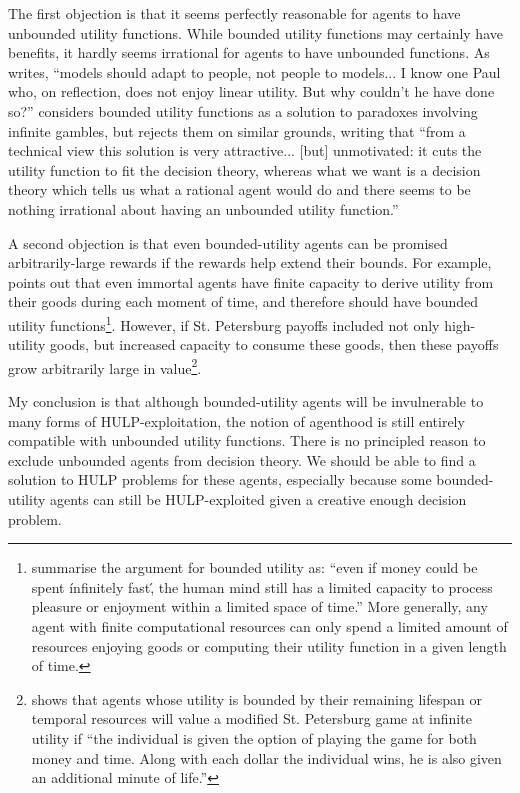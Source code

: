 \documentclass{article}
\begin{document}
The first objection is that it seems perfectly reasonable for agents to have unbounded utility functions. While bounded utility functions may certainly have benefits, it hardly seems irrational for agents to have unbounded functions. As \citep{samuelson1977st} writes, ``models should adapt to people, not people to models... I know one Paul who, on reflection, does not enjoy linear utility. But why couldn't he have done so?'' \citep{smith2014evaluative} considers bounded utility functions as a solution to paradoxes involving infinite gambles, but rejects them on similar grounds, writing that ``from a technical view this solution is very attractive... [but] unmotivated: it cuts the utility function to fit the decision theory, whereas what we want is a decision theory which tells us what a rational agent would do \textemdash{} and there seems to be nothing irrational about having an unbounded utility function.''

A second objection is that even bounded-utility agents can be promised arbitrarily-large rewards if the rewards help extend their bounds. For example, \citep{brito1975becker} points out that even immortal agents have finite capacity to derive utility from their goods during each moment of time, and therefore should have bounded utility functions\footnote{\citep{cowen1988time} summarise the argument for bounded utility as: ``even if money could be spent \'infinitely fast\', the human mind still has a limited capacity to process pleasure or enjoyment within a limited space of time.'' More generally, any agent with finite computational resources can only spend a limited amount of resources enjoying goods or computing their utility function in a given length of time.}. However, if St. Petersburg payoffs included not only high-utility goods, but increased capacity to consume these goods, then these payoffs grow arbitrarily large in value\footnote{\citep{cowen1988time} shows that agents whose utility is bounded by their remaining lifespan or temporal resources will value a modified St. Petersburg game at infinite utility if ``the individual is given the option of playing the game for both money and time. Along with each dollar the individual wins, he is also given an additional minute of life.''}. 

My conclusion is that although bounded-utility agents will be invulnerable to many forms of HULP-exploitation, the notion of agenthood is still entirely compatible with unbounded utility functions. There is no principled reason to exclude unbounded agents from decision theory. We should be able to find a solution to HULP problems for these agents, especially because some bounded-utility agents can still be HULP-exploited given a creative enough decision problem.
\end{document}
